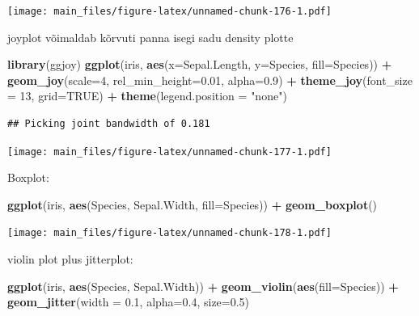 \documentclass[]{book}
\newenvironment{Shaded}{\begin{snugshade}}{\end{snugshade}}
\newcommand{\KeywordTok}[1]{\textcolor[rgb]{0.13,0.29,0.53}{\textbf{#1}}}
\newcommand{\DataTypeTok}[1]{\textcolor[rgb]{0.13,0.29,0.53}{#1}}
\newcommand{\DecValTok}[1]{\textcolor[rgb]{0.00,0.00,0.81}{#1}}
\newcommand{\FloatTok}[1]{\textcolor[rgb]{0.00,0.00,0.81}{#1}}
\newcommand{\StringTok}[1]{\textcolor[rgb]{0.31,0.60,0.02}{#1}}
\newcommand{\OtherTok}[1]{\textcolor[rgb]{0.56,0.35,0.01}{#1}}
\newcommand{\OperatorTok}[1]{\textcolor[rgb]{0.81,0.36,0.00}{\textbf{#1}}}
\newcommand{\NormalTok}[1]{#1}
\begin{document}
\texttt{[image: main\_files/figure-latex/unnamed-chunk-176-1.pdf]}

joyplot võimaldab kõrvuti panna isegi sadu density plotte

\begin{Shaded}
\begin{Highlighting}[]
\KeywordTok{library}\NormalTok{(ggjoy)}
\KeywordTok{ggplot}\NormalTok{(iris, }\KeywordTok{aes}\NormalTok{(}\DataTypeTok{x=}\NormalTok{Sepal.Length, }\DataTypeTok{y=}\NormalTok{Species, }\DataTypeTok{fill=}\NormalTok{Species)) }\OperatorTok{+}\StringTok{ }
\StringTok{  }\KeywordTok{geom_joy}\NormalTok{(}\DataTypeTok{scale=}\DecValTok{4}\NormalTok{, }\DataTypeTok{rel_min_height=}\FloatTok{0.01}\NormalTok{, }\DataTypeTok{alpha=}\FloatTok{0.9}\NormalTok{) }\OperatorTok{+}
\StringTok{  }\KeywordTok{theme_joy}\NormalTok{(}\DataTypeTok{font_size =} \DecValTok{13}\NormalTok{, }\DataTypeTok{grid=}\OtherTok{TRUE}\NormalTok{) }\OperatorTok{+}\StringTok{ }
\StringTok{  }\KeywordTok{theme}\NormalTok{(}\DataTypeTok{legend.position =} \StringTok{"none"}\NormalTok{)}
\end{Highlighting}
\end{Shaded}

\begin{verbatim}
## Picking joint bandwidth of 0.181
\end{verbatim}

\texttt{[image: main\_files/figure-latex/unnamed-chunk-177-1.pdf]}

Boxplot:

\begin{Shaded}
\begin{Highlighting}[]
\KeywordTok{ggplot}\NormalTok{(iris, }\KeywordTok{aes}\NormalTok{(Species, Sepal.Width, }\DataTypeTok{fill=}\NormalTok{Species)) }\OperatorTok{+}\StringTok{ }\KeywordTok{geom_boxplot}\NormalTok{()}
\end{Highlighting}
\end{Shaded}

\texttt{[image: main\_files/figure-latex/unnamed-chunk-178-1.pdf]}

violin plot plus jitterplot:

\begin{Shaded}
\begin{Highlighting}[]
\KeywordTok{ggplot}\NormalTok{(iris, }\KeywordTok{aes}\NormalTok{(Species, Sepal.Width)) }\OperatorTok{+}\StringTok{ }
\StringTok{  }\KeywordTok{geom_violin}\NormalTok{(}\KeywordTok{aes}\NormalTok{(}\DataTypeTok{fill=}\NormalTok{Species)) }\OperatorTok{+}
\StringTok{  }\KeywordTok{geom_jitter}\NormalTok{(}\DataTypeTok{width =} \FloatTok{0.1}\NormalTok{, }\DataTypeTok{alpha=}\FloatTok{0.4}\NormalTok{, }\DataTypeTok{size=}\FloatTok{0.5}\NormalTok{)}
\end{Highlighting}
\end{Shaded}
\end{document}
